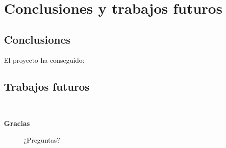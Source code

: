 \documentclass[compress]{beamer}
\begin{document}
\section{Conclusiones y trabajos futuros}
\subsection{Conclusiones}
\begin{frame}{}
		El proyecto ha conseguido:
	
\end{frame}


\subsection{Trabajos futuros}
\begin{frame}{}
	\
\end{frame}


\begin{frame}
	\centering \textbf{Gracias}

	\begin{figure}[H,font=\Small]
		\centering
		\label{fig:calidad}
		
		¿Preguntas?
		
	\end{figure}
	
	
\end{frame}
\end{document}
